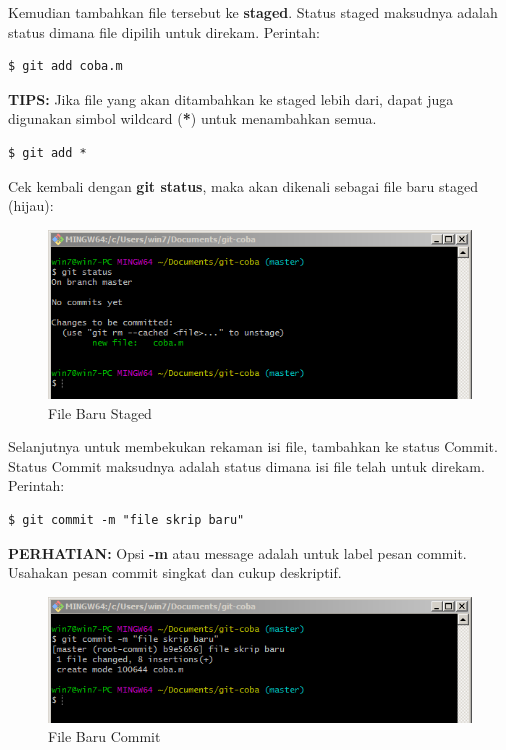 \documentclass[12pt]{book}
\begin{document}
	Kemudian tambahkan file tersebut ke \textbf{staged}.
	Status staged maksudnya adalah status dimana file dipilih untuk direkam.
	Perintah:
	\begin{verbatim}
$ git add coba.m
	\end{verbatim}

	\textbf{TIPS:} Jika file yang akan ditambahkan ke staged lebih dari,
	dapat juga digunakan simbol wildcard (\textbf{*}) untuk menambahkan semua.
	\begin{verbatim}
$ git add *
	\end{verbatim}
	
	Cek kembali dengan \textbf{git status}, maka akan dikenali sebagai file baru staged (hijau):
	
	\begin{figure}[!ht]
		\centering
		\includegraphics[width=400pt]{images/git4}
		\caption{File Baru Staged}
	\end{figure}

	Selanjutnya untuk membekukan rekaman isi file, tambahkan ke status Commit.
	Status Commit maksudnya adalah status dimana isi file telah untuk direkam.
	Perintah:
	\begin{verbatim}
$ git commit -m "file skrip baru"
	\end{verbatim}

	\textbf{PERHATIAN:} Opsi \textbf{-m} atau message adalah untuk label pesan commit.
	Usahakan pesan commit singkat dan cukup deskriptif.
	
	\begin{figure}[!ht]
		\centering
		\includegraphics[width=400pt]{images/git5}
		\caption{File Baru Commit}
	\end{figure}
\end{document}
